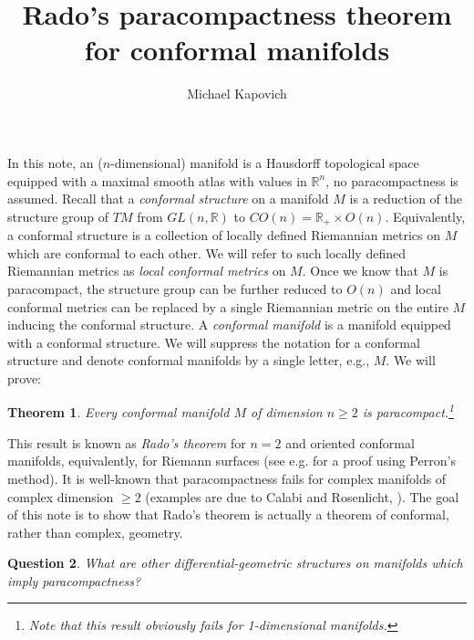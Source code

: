 \documentclass[11pt]{article}   	%
\title{Rado's paracompactness theorem for conformal manifolds}
\author{Michael Kapovich}
\newtheorem{thm}{Theorem}
\newtheorem{question}[thm]{Question}
\def\R{\mathbb R}
\begin{document}
\maketitle



In this note, an ($n$-dimensional) manifold is a Hausdorff topological space equipped with a maximal smooth atlas with values in $\R^n$, 
no paracompactness is assumed. Recall that a {\em conformal structure} on a manifold $M$ is a reduction of the structure group of $TM$ from $GL(n,\R)$ to $CO(n)=\mathbb R_+\times O(n)$. Equivalently, a conformal structure is a collection of locally defined Riemannian metrics on $M$ which are conformal to each other. We will refer to such locally defined Riemannian metrics as {\em local conformal metrics} on $M$. Once we know that $M$ is paracompact, the structure group can be further reduced 
to $O(n)$ and local conformal metrics can be replaced by a single Riemannian metric on the entire $M$ inducing the conformal structure. 
A {\em conformal manifold} is a manifold equipped with a conformal structure. We will suppress the notation for a conformal structure and denote 
conformal manifolds by a single letter, e.g., $M$.  We will prove: 

\begin{thm}\label{thm:main}
Every conformal manifold $M$ of dimension $n\ge 2$ is paracompact.\footnote{Note that this result obviously fails for 1-dimensional manifolds.} 
\end{thm}

This result is known as {\em Rado's theorem} for $n=2$ and oriented conformal manifolds, equivalently, for Riemann surfaces 
(see e.g. \cite[\S 23]{Forster} for a proof using Perron's method). 
It is well-known that paracompactness fails for complex manifolds of complex dimension $\ge 2$ 
(examples are due to Calabi and Rosenlicht, \cite{CR}). 
The goal of this note is to show that Rado's theorem is actually a 
theorem of conformal, rather than complex, geometry.  

\begin{question}
What are other differential-geometric structures on manifolds which imply paracompactness? 
\end{question}
\end{document}
